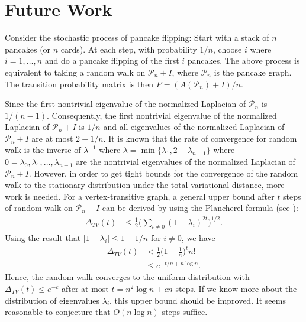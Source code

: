
\section{Future Work}
Consider the stochastic process of pancake flipping:  Start with a stack of $n$ pancakes (or $n$ cards). At each
step, with probability $1/n$,  choose $i$ where $i=1, \ldots, n$ and  do a pancake flipping of the first $i$ pancakes. 
The above process is equivalent to taking a random walk on 
$\mathcal{P}_n + I$, where $\mathcal{P}_n$ is the pancake graph. The transition probability 
matrix is then $P=(A(\mathcal{P}_n)+I)/n$.

Since the first nontrivial eigenvalue of the normalized Laplacian of $\mathcal{P}_n$ is $1/(n-1)$. Consequently,
the first nontrivial eigenvalue of
the normalized Laplacian of $\mathcal{P}_n + I$ is $1/n$ and all eigenvalues of the normalized Laplacian
of $\mathcal{P}_n + I$ are at most $2-1/n$. It is known that the rate of convergence for random walk is the inverse of  $\lambda^{-1}$ where $\lambda= \min \{\lambda_1, 2-\lambda_{n-1}\}$ where $0=\lambda_0,
\lambda_1, \ldots, \lambda_{n-1}$ are the nontrivial eigenvalues of the normalized Laplacian of $\mathcal{P}_n + I$. However, in order to get tight bounds for the convergence of the random walk to the stationary distribution under the  total variational distance, more work is needed. For a vertex-transitive graph, a general upper bound after $t$ steps of random walk on 
$\mathcal{P}_n + I$ can be derived by using the Plancherel formula (see \cite{Chung1997}):
\begin{align*}
\Delta_{TV}(t) &\leq \frac 1 2 \Big( \sum_{i \not = 0} (1-\lambda_i)^{2t}\Big)^{1/2}.
\end{align*}
Using the result that $|1-\lambda_i| \leq 1-1/n$ for $i \not = 0$, we have
\begin{align*}
\Delta_{TV}(t) &< \frac 1 2 \Big(1-\frac 1 n\Big)^t n!\\
&\leq e^{-t/n+n \log n}.
\end{align*}
Hence, the random walk converges to the uniform distribution with $\Delta_{TV}(t) \leq e^{-c}$ after at most $t=n^2 \log n + c n$ steps.
If we know more about the distribution of eigenvalues $\lambda_i$, this upper bound should be improved.
It seems reasonable to conjecture that $O(n \log n)$ steps suffice.


